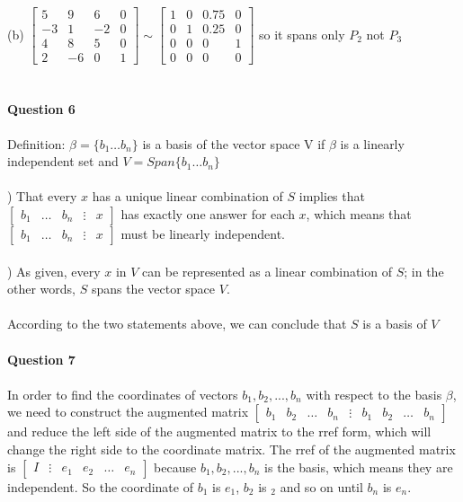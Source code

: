 \documentclass{article}
\begin{document}
\\\\
\indent(b)\indent
$\begin{bmatrix}5&9&6&0\\-3&1&-2&0\\4&8&5&0\\2&-6&0&1\end{bmatrix} \sim \begin{bmatrix}1&0&0.75&0\\0&1&0.25&0\\0&0&0&1\\0&0&0&0\end{bmatrix}$ so it spans only $P_2$ not $P_3$
\\\\\\
\noindent\textbf{Question 6}\\\\
Definition: $\beta = \{b_1 \hdots b_n\}$ is a basis of the vector space V if $\beta$ is a linearly independent set and $V = Span\{b_1 \hdots b_n\}$
\\\\
) That every $x$ has a unique linear combination of $S$ implies that $\begin{bmatrix}b_1 & \hdots & b_n & \vdots & x\end{bmatrix}$ has exactly one answer for each $x$, which means that $\begin{bmatrix}b_1 & \hdots & b_n & \vdots & x\end{bmatrix}$ must be linearly independent.
\\\\
) As given, every $x$ in $V$ can be represented as a linear combination of $S$; in the other words, $S$ spans the vector space $V$. 
\\\\
\indent According to the two statements above, we can conclude that $S$ is a basis of $V$
\\\\
\noindent\textbf{Question 7}\\\\
In order to find the coordinates of vectors $b_1, b_2, ..., b_n$ with respect to the basis $\beta$, we need to construct the augmented matrix $\begin{bmatrix}b_1&b_2&\hdots&b_n&\vdots&b_1&b_2&\hdots&b_n\end{bmatrix}$ and reduce the left side of the augmented matrix to the rref form, which will change the right side to the coordinate matrix. The rref of the augmented matrix is $\begin{bmatrix}I&\vdots&e_1&e_2&\hdots&e_n\end{bmatrix}$ because $b_1, b_2, ..., b_n$ is the basis, which means they are independent. So the coordinate of $b_1$ is $e_1$, $b_2$ is $_2$ and so on until $b_n$ is $e_n$.
\end{document}
